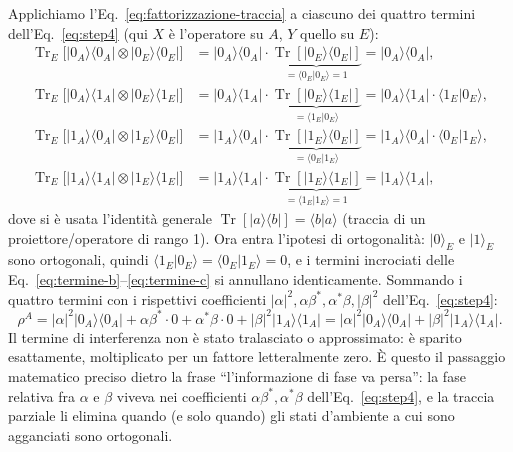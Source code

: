 \documentclass[11pt,a4paper]{article}
\newcommand{\ket}[1]{\lvert #1 \rangle}
\newcommand{\bra}[1]{\langle #1 \rvert}
\newcommand{\braket}[1]{\langle #1 \rangle}
\newcommand{\Tr}{\operatorname{Tr}}
\begin{document}
Applichiamo l'Eq.~\eqref{eq:fattorizzazione-traccia} a ciascuno dei quattro termini
dell'Eq.~\eqref{eq:step4} (qui $X$ è l'operatore su $A$, $Y$ quello su $E$):
\begin{align}
\Tr_E\big[\ket{0_A}\bra{0_A}\otimes\ket{0_E}\bra{0_E}\big]
  &= \ket{0_A}\bra{0_A}\cdot\underbrace{\Tr[\ket{0_E}\bra{0_E}]}_{=\braket{0_E|0_E}=1}
  = \ket{0_A}\bra{0_A}, \label{eq:termine-a}\\
\Tr_E\big[\ket{0_A}\bra{1_A}\otimes\ket{0_E}\bra{1_E}\big]
  &= \ket{0_A}\bra{1_A}\cdot\underbrace{\Tr[\ket{0_E}\bra{1_E}]}_{=\braket{1_E|0_E}}
  = \ket{0_A}\bra{1_A}\cdot\braket{1_E|0_E}, \label{eq:termine-b}\\
\Tr_E\big[\ket{1_A}\bra{0_A}\otimes\ket{1_E}\bra{0_E}\big]
  &= \ket{1_A}\bra{0_A}\cdot\underbrace{\Tr[\ket{1_E}\bra{0_E}]}_{=\braket{0_E|1_E}}
  = \ket{1_A}\bra{0_A}\cdot\braket{0_E|1_E}, \label{eq:termine-c}\\
\Tr_E\big[\ket{1_A}\bra{1_A}\otimes\ket{1_E}\bra{1_E}\big]
  &= \ket{1_A}\bra{1_A}\cdot\underbrace{\Tr[\ket{1_E}\bra{1_E}]}_{=\braket{1_E|1_E}=1}
  = \ket{1_A}\bra{1_A}, \label{eq:termine-d}
\end{align}
dove si è usata l'identità generale $\Tr[\ket a\bra b]=\braket{b|a}$ (traccia di un
proiettore/operatore di rango 1). Ora entra l'ipotesi di ortogonalità: $\ket0_E$ e
$\ket1_E$ sono ortogonali, quindi $\braket{1_E|0_E}=\braket{0_E|1_E}=0$, e i termini
incrociati delle Eq.~\eqref{eq:termine-b}--\eqref{eq:termine-c} si annullano
identicamente. Sommando i quattro termini con i rispettivi coefficienti
$|\alpha|^2,\alpha\beta^*,\alpha^*\beta,|\beta|^2$ dell'Eq.~\eqref{eq:step4}:
\begin{equation}
\rho^A = |\alpha|^2\ket{0_A}\bra{0_A} + \alpha\beta^*\cdot0 + \alpha^*\beta\cdot0
+ |\beta|^2\ket{1_A}\bra{1_A} = |\alpha|^2\ket{0_A}\bra{0_A}+|\beta|^2\ket{1_A}\bra{1_A}.
\label{eq:rhoA-finale}
\end{equation}
Il termine di interferenza non è stato tralasciato o approssimato: è sparito
esattamente, moltiplicato per un fattore letteralmente zero. È questo il passaggio
matematico preciso dietro la frase ``l'informazione di fase va persa'': la fase
relativa fra $\alpha$ e $\beta$ viveva nei coefficienti $\alpha\beta^*,\alpha^*\beta$
dell'Eq.~\eqref{eq:step4}, e la traccia parziale li elimina quando (e solo quando)
gli stati d'ambiente a cui sono agganciati sono ortogonali.
\end{document}
